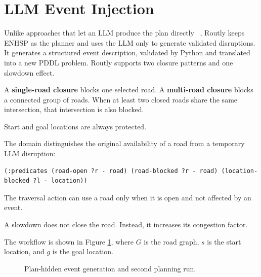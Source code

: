 \documentclass[10pt]{article}
\begin{document}
\section{LLM Event Injection}


Unlike approaches that let an LLM produce the plan directly
~\cite{valmeekam2023}, Routly keeps ENHSP as the planner and uses the LLM only
to generate validated disruptions. It generates a structured
event description, validated by Python and translated into a new PDDL
problem. Routly supports two closure patterns and one slowdown effect.

A \textbf{single-road closure} blocks one selected road. A
\textbf{multi-road closure} blocks a connected group of roads. When at least
two closed roads share the same intersection, that intersection is also
blocked. 

Start and goal locations are always protected.

The domain distinguishes the original availability of a road from a temporary
LLM disruption:

\vspace{0.5em}
\begin{lstlisting}
(:predicates (road-open ?r - road) (road-blocked ?r - road) (location-blocked ?l - location))
\end{lstlisting}

The traversal action can use a road only when it is open and not affected by an
event.

A slowdown does not close the road. Instead, it increases its congestion
factor.

The workflow is shown in Figure \ref{fig:llm-protocol}, where \(G\) is the road
graph, \(s\) is the start location, and \(g\) is the goal location.

\begin{figure}[H]
\centering
{}
\caption{Plan-hidden event generation and second planning run.}
\label{fig:llm-protocol}
\end{figure}
\end{document}
